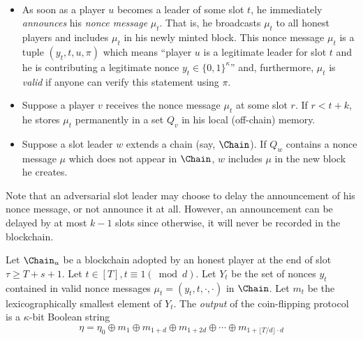 ~ 
\begin{itemize}
	\item As soon as a player $u$ becomes a leader of some slot $t$, 
	he immediately \emph{announces} his \emph{nonce message} $\mu_t$. 
	That is, he broadcasts $\mu_t$ to all honest players 
	and includes $\mu_t$ in his newly minted block. 
	This nonce message $\mu_t$ is a tuple $(y_t, t, u, \pi)$ 
	which means ``player $u$ is a legitimate leader for slot $t$ and 
	he is contributing a legitimate nonce $y_t \in \{0,1\}^\kappa$'' and, furthermore, 
	$\mu_t$ is \emph{valid} if anyone can verify this statement using $\pi$. 

	\item Suppose a player $v$ receives the nonce message $\mu_t$ at some slot $r$. 
	If $r< t + k$, he stores $\mu_t$ permanently in a set $Q_v$ in his local (off-chain) memory.

	\item Suppose a slot leader $w$ extends a chain (say, $\Chain$). 
	If $Q_w$ contains a nonce message $\mu$ which 
	does not appear in $\Chain$, 
	$w$ includes $\mu$ in the new block he creates.
\end{itemize}
Note that an adversarial slot leader 
may choose to delay the announcement of his nonce message, 
or not announce it at all.
However, an announcement can be delayed by at most $k - 1$ slots since 
otherwise, it will never be recorded in the blockchain.


Let $\Chain_u$ be a blockchain 
adopted by an honest player 
at the end of slot {\color{red}$\tau \geq T + s + 1$}. 
Let $t \in [T], t \equiv 1 (\bmod d)$. 
Let $Y_t$ be the set of nonces $y_t$
contained in valid nonce messages 
$\mu_t = (y_t, t, \cdot, \cdot)$ 
in $\Chain$. 
Let $m_t$ be the lexicographically smallest element of $Y_t$. 
The \emph{output} of the coin-flipping protocol is a $\kappa$-bit Boolean string 
$$
	\eta = \eta_0 \oplus m_1 \oplus m_{1 + d} \oplus m_{1 + 2d} \oplus \cdots \oplus m_{1 + \lfloor T/d \rfloor \cdot d}
$$ 



